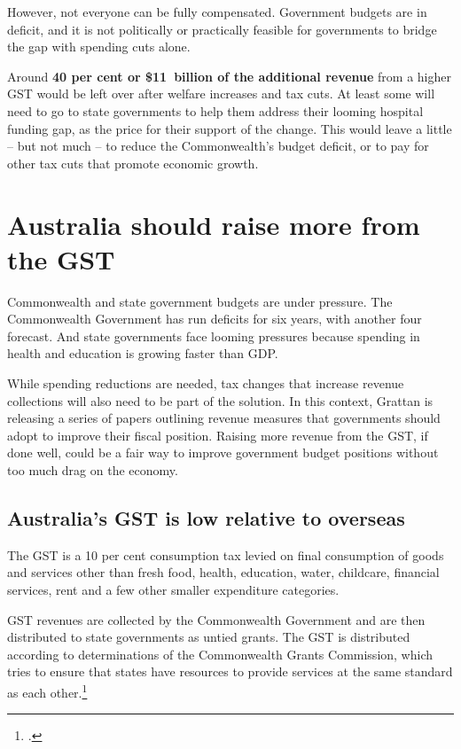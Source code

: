 \begin{overview}[-20pt]
However, not everyone can be fully compensated. Government budgets are in deficit, and it is not politically or practically feasible for governments to bridge the gap with spending cuts alone.

Around \textbf{40 per cent or \$11~billion of the additional revenue} from a higher GST would be left over after welfare increases and tax cuts. At least some will need to go to state governments to help them address their looming hospital funding gap, as the price for their support of the change. This would leave a little – but not much – to reduce the Commonwealth’s budget deficit, or to pay for other tax cuts that promote economic growth. 
\end{overview}
\addtolength{\columnsep}{-\overviewextra}

\chapter{Australia should raise more from the GST}\label{chapter:GST-1}
Commonwealth and state government budgets are under pressure. The Commonwealth Government has run deficits for six years, with another four forecast. And state governments face looming pressures because spending in health and education is growing faster than GDP.

While spending reductions are needed, tax changes that increase revenue collections will also need to be part of the solution. In this context, Grattan is releasing a series of papers outlining revenue measures that governments should adopt to improve their fiscal position.  Raising more revenue from the GST, if done well, could be a fair way to improve government budget positions without too much drag on the economy. 

\section{Australia's\DEVIATION{} GST is low relative to overseas}\label{sec:GST-1-1}
The GST is a 10 per cent consumption tax levied on final consumption of goods and services other than fresh food, health, education, water, childcare, financial services, rent and a few other smaller expenditure categories. 

GST revenues are collected by the Commonwealth Government and are then distributed to state governments as untied grants. The GST is distributed according to determinations of the Commonwealth Grants Commission, which tries to ensure that states have resources to provide services at the same standard as each other.\footcite[][12]{CGC2015} 

